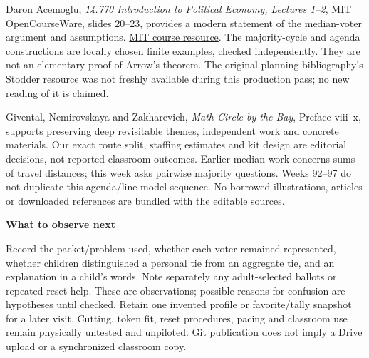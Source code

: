\documentclass[11pt,letterpaper]{article}
\newcommand{\sub}[1]{\par\textbf{#1}\par}
\begin{document}
Daron Acemoglu, \emph{14.770 Introduction to Political Economy, Lectures 1--2}, MIT OpenCourseWare, slides 20--23, provides a modern statement of the median-voter argument and assumptions. \href{https://ocw.mit.edu/courses/14-770-introduction-to-political-economy-fall-2017/bdc7ef5c8617eaf573dc28da5c2e19ef_MIT14_770F17_lec1_2_acemoglu.pdf}{MIT course resource}. The majority-cycle and agenda constructions are locally chosen finite examples, checked independently. They are not an elementary proof of Arrow's theorem. The original planning bibliography's Stodder resource was not freshly available during this production pass; no new reading of it is claimed.

Givental, Nemirovskaya and Zakharevich, \emph{Math Circle by the Bay}, Preface viii--x, supports preserving deep revisitable themes, independent work and concrete materials. Our exact route split, staffing estimates and kit design are editorial decisions, not reported classroom outcomes. Earlier median work concerns sums of travel distances; this week asks pairwise majority questions. Weeks 92--97 do not duplicate this agenda/line-model sequence. No borrowed illustrations, articles or downloaded references are bundled with the editable sources.

\sub{What to observe next}
Record the packet/problem used, whether each voter remained represented, whether children distinguished a personal tie from an aggregate tie, and an explanation in a child's words. Note separately any adult-selected ballots or repeated reset help. These are observations; possible reasons for confusion are hypotheses until checked. Retain one invented profile or favorite/tally snapshot for a later visit. Cutting, token fit, reset procedures, pacing and classroom use remain physically untested and unpiloted. Git publication does not imply a Drive upload or a synchronized classroom copy.
\end{document}
